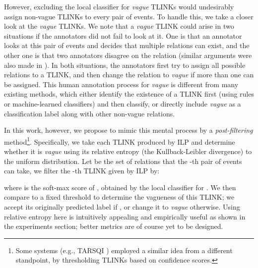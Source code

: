 \documentclass[11pt,letterpaper]{article}
\newcommand{\ignore}[1]{}
\newcommand{\final}[1]{#1}
\begin{document}
{However, excluding the local classifier for {\em vague} TLINKs would undesirably assign non-vague TLINKs to every pair of events. To handle this, we take a closer look at the {\em vague} TLINKs.
\final{We note that a {\em vague} TLINK could arise in two situations if the annotators did not fail to look at it.}
One is that an annotator looks at this pair of events and decides that multiple relations can exist, and the other one is that two annotators disagree on the relation (similar arguments were also made in \citet{cassidy2014annotation}).
In both situations, the annotators first try to assign all possible relations to a TLINK, and then change the relation to {\em vague} if more than one \final{can be} assigned.
This human annotation process for {\em vague} is different from many existing methods, which either identify the existence of a TLINK first (using rules or machine-learned classifiers) and then classify, or directly include {\em vague} as a classification label along with other non-vague relations.

In this work, however, we propose to mimic this \final{mental} process by a {\em post-filtering} method\footnote{Some systems (e.g., TARSQI \citep{verhagen2008temporal}) \final{employed a} similar idea from a different standpoint, by thresholding TLINKs based on confidence scores.}.
Specifically, \final{we} take each TLINK produced by ILP and determine whether it is {\em vague} using its relative entropy (the Kullback-Leibler divergence) to the uniform distribution. Let  be the set of relations that the -th pair of events can take, we filter the -th TLINK given by ILP by:     

where  is the soft-max score of , obtained by the local classifier for .
We then compare  to a fixed threshold  to determine the vagueness of this TLINK; \final{we} accept its originally predicted label if , or  change it to {\em vague} otherwise.
Using relative entropy here is intuitively appealing and empirically useful as shown in the experiments section; better metrics are of course yet to be designed.

\ignore{
This process is intuitively appealing and is different to many existing methods, which either identify the existence of a TLINK first (using rules or machine-learned classifiers) and then classify, or directly include {\em vague} as a classification label along with other non-vague relations.
This post-filtering strategy thus provides us with a new perspective to treating {\em vague} TLINKs in temporal relation extraction.
This new perspective towards treating {\em vague} TLINKs gives rise to the {\em post-filtering} method, in contrast to the aforementioned ``pre-filtering'' method.
}


}
\end{document}
